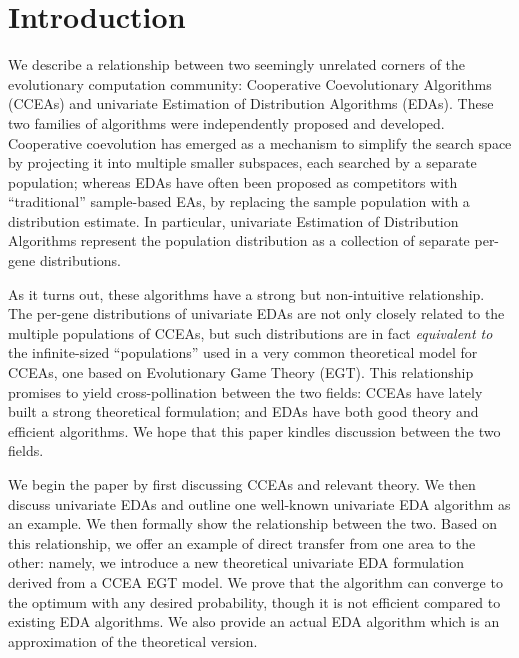 \documentclass{sig-alt-full}
\begin{document}



\section{Introduction}

We describe a relationship between two seemingly unrelated corners of the evolutionary computation community: Cooperative Coevolutionary Algorithms (CCEAs) and univariate Estimation of Distribution Algorithms (EDAs).  These two families of algorithms were independently proposed and developed.  Cooperative coevolution has emerged as a mechanism to simplify the search space by projecting it into multiple smaller subspaces, each searched by a separate population; whereas EDAs have often been proposed as competitors with ``traditional'' sample-based EAs, by replacing the sample population with a distribution estimate.  In particular, univariate Estimation of Distribution Algorithms represent the population distribution as a collection of separate per-gene distributions.

As it turns out, these algorithms have a strong but non-intuitive relationship. The per-gene distributions of univariate EDAs are not only closely related to the multiple populations of CCEAs, but such distributions are in fact {\it equivalent to} the infinite-sized ``populations'' used in a very common theoretical model for CCEAs, one based on Evolutionary Game Theory (EGT).  This relationship promises to yield cross-pollination between the two fields: CCEAs have lately built a strong theoretical formulation; and EDAs have both good theory and efficient algorithms.  We hope that this paper kindles discussion between the two fields. 

We begin the paper by first discussing CCEAs and relevant theory.  We then discuss univariate EDAs and outline one well-known univariate EDA algorithm as an example. We then formally show the relationship between the two.  Based on this relationship, we offer an example of direct transfer from one area to the other: namely, we introduce a new theoretical univariate EDA formulation derived from a CCEA EGT model.  We prove that the algorithm can converge to the optimum with any desired probability, though it is not efficient compared to existing EDA algorithms.  We also provide an actual EDA algorithm which is an approximation of the theoretical version.
\end{document}
